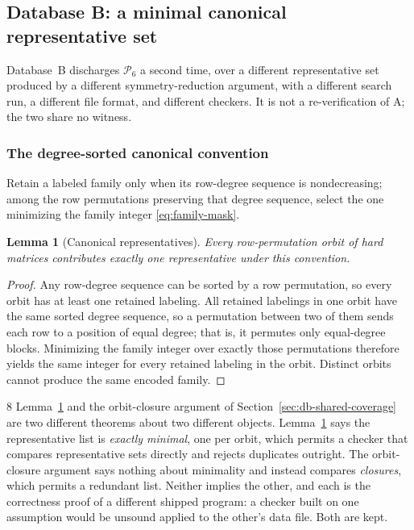 \documentclass[11pt,letterpaper]{article}
\numberwithin{equation}{section}
\newtheorem{lemma}[theorem]{Lemma}
\theoremstyle{definition}
\theoremstyle{remark}
\newcommand{\dbA}{\textsf{A}}
\newcommand{\dbB}{\textsf{B}}
\begin{document}
\subsection{Database \dbB{}: a minimal canonical representative set}
\label{sec:db-theorem}
Database~\dbB{} discharges $\mathcal P_6$ a second time, over a different
representative set produced by a different symmetry-reduction argument, with
a different search run, a different file format, and different checkers.
It is not a re-verification of \dbA{}; the two share no witness.

\subsubsection{The degree-sorted canonical convention}
Retain a labeled family only when its row-degree sequence is nondecreasing;
among the row permutations preserving that degree sequence, select the one
minimizing the family integer \eqref{eq:family-mask}.

\begin{lemma}[Canonical representatives]\label{lem:canonical}
Every row-permutation orbit of hard matrices contributes exactly one
representative under this convention.
\end{lemma}
\begin{proof}
Any row-degree sequence can be sorted by a row permutation, so every orbit has
at least one retained labeling. All retained labelings in one orbit have the
same sorted degree sequence, so a permutation between two of them sends each
row to a position of equal degree; that is, it permutes only equal-degree
blocks. Minimizing the family integer over exactly those permutations
therefore yields the same integer for every retained labeling in the orbit.
Distinct orbits cannot produce the same encoded family.
\end{proof}

\begin{variantbox}{8}
Lemma~\ref{lem:canonical} and the orbit-closure argument of
Section~\ref{sec:db-shared-coverage} are two different theorems about two
different objects. Lemma~\ref{lem:canonical} says the representative list is
\emph{exactly minimal}, one per orbit, which permits a checker that compares
representative sets directly and rejects duplicates outright. The
orbit-closure argument says nothing about minimality and instead compares
\emph{closures}, which permits a redundant list. Neither implies the other,
and each is the correctness proof of a different shipped program: a checker
built on one assumption would be unsound applied to the other's data file.
Both are kept.
\end{variantbox}
\end{document}
